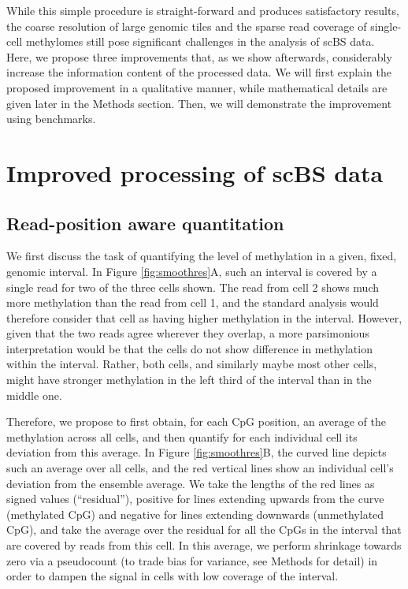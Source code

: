 \documentclass[twocolumn,10pt]{article}
\begin{document}
While this simple procedure is straight-forward and produces satisfactory results, the coarse resolution of large genomic tiles and the sparse read coverage of single-cell methylomes still pose significant challenges in the analysis of scBS data.
Here, we propose three improvements that, as we show afterwards, considerably increase the information content of the processed data.
We will first explain the proposed improvement in a qualitative manner, while mathematical details are given later in the Methods section.
Then, we will demonstrate the improvement using benchmarks.

\section{Improved processing of scBS data}

\subsection{Read-position aware quantitation} \label{residuals}

We first discuss the task of quantifying the level of methylation in a given, fixed, genomic interval.
In Figure \ref{fig:smoothres}A, such an interval is covered by a single read for two of the three cells shown.
The read from cell 2 shows much more methylation than the read from cell 1, and the standard analysis would therefore consider that cell as having higher methylation in the interval.
However, given that the two reads agree wherever they overlap, a more parsimonious interpretation would be that the cells do not show difference in methylation within the interval.
Rather, both cells, and similarly maybe most other cells, might have stronger methylation in the left third of the interval than in the middle one.

Therefore, we propose to first obtain, for each CpG position, an average of the methylation across all cells, and then quantify for each individual cell its deviation from this average.
In Figure \ref{fig:smoothres}B, the curved line depicts such an average over all cells, and the red vertical lines show an individual cell's deviation from the ensemble average.
We take the lengths of the red lines as signed values (``residual''), positive for lines extending upwards from the curve (methylated CpG) and negative for lines extending downwards (unmethylated CpG), and take the average over the residual for all the CpGs in the interval that are covered by reads from this cell.
In this average, we perform shrinkage towards zero via a pseudocount (to trade bias for variance, see Methods for detail) in order to dampen the signal in cells with low coverage of the interval.
\end{document}
